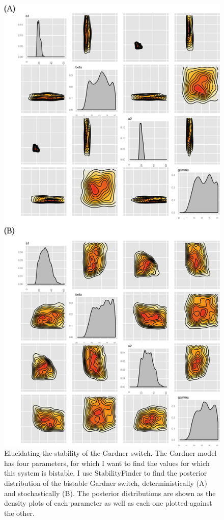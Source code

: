 \begin{figure}[htbp]
\begin{center}
	\includegraphics[scale=0.8]{../../chapters/chapterStabilityFinder/images/gardner_posteriors.png}
	\caption[The posterior distributions of the bistable Gardner toggle switch]{\label{fig:gard_post} Elucidating the stability of the Gardner switch. The Gardner model has four parameters, for which I want to find the values for which this system is bistable. I use StabilityFinder to find the posterior distribution of the bistable Gardner switch, deterministically (A) and stochastically (B). The posterior distributions are shown as the density plots of each parameter as well as each one plotted against the other.  }
\end{center}
\end{figure}
